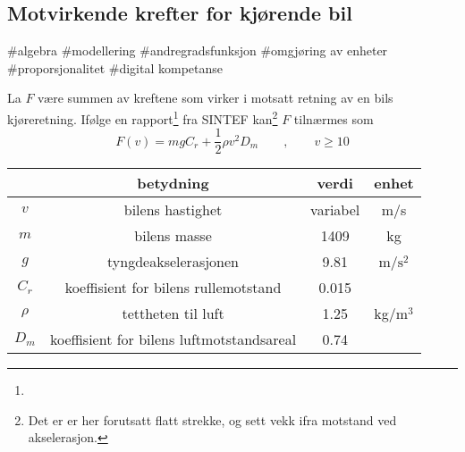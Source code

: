





\subsection*{Motvirkende krefter for kjørende bil}
\#algebra \#modellering \#andregradsfunksjon \#omgjøring av enheter \\\#proporsjonalitet \#digital kompetanse\vsk

La $ F $ være summen av kreftene som virker i motsatt retning av en bils kjøreretning. Ifølge en rapport\footnote{} fra SINTEF kan\footnote{Det er er her forutsatt flatt strekke, og sett vekk ifra motstand ved akselerasjon.} $ F $ tilnærmes som
\[ F(v)= mgC_r+\frac{1}{2}\rho v^2 D_m\qquad,\qquad v\geq10\]
\begin{center}
	\begin{tabular}{c|c|c|c}
		& \textbf{betydning} & \textbf{verdi}&\textbf{enhet}  \\ \hline
		$ v $ & bilens hastighet & variabel& m/s \\
		$ m $& bilens masse\footnotemark & 1409 & kg\\
		$ g $& tyngdeakselerasjonen & 9.81 & m/$ \text{s}^2 $ \\
		$ C_r $ & koeffisient for bilens rullemotstand & 0.015\\
		$ \rho $ & tettheten til luft & 1.25 & kg/$ \text{m}^3 $ \\
		$ D_m $& koeffisient for bilens luftmotstandsareal\footnotemark &0.74
	\end{tabular}
\end{center}


